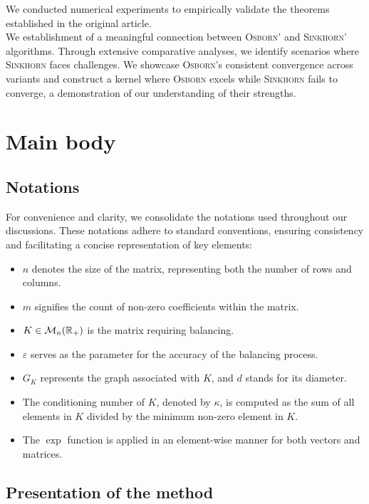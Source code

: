 We conducted numerical experiments to empirically validate the theorems established in the original article.\\

We establishment of a meaningful connection between \textsc{Osborn}' and \textsc{Sinkhorn}' algorithms. Through extensive comparative analyses, we identify scenarios where \textsc{Sinkhorn} faces challenges. We showcase \textsc{Osborn}'s consistent convergence across variants and construct a kernel where \textsc{Osborn} excels while \textsc{Sinkhorn} fails to converge, a demonstration of our understanding of their strengths.

\section{Main body}

\subsection{Notations}

For convenience and clarity, we consolidate the notations used throughout our discussions. These notations adhere to standard conventions, ensuring consistency and facilitating a concise representation of key elements:

\begin{itemize}
    \item \(n\) denotes the size of the matrix, representing both the number of rows and columns.
    \item \(m\) signifies the count of non-zero coefficients within the matrix.
    \item \(K \in \mathcal M_n(\mathbb{R}_+)\) is the matrix requiring balancing.
    \item \(\varepsilon\) serves as the parameter for the accuracy of the balancing process.
    \item \(G_K\) represents the graph associated with \(K\), and \(d\) stands for its diameter.
    \item The conditioning number of \(K\), denoted by \(\kappa\), is computed as the sum of all elements in \(K\) divided by the minimum non-zero element in \(K\).
    \item The \(\exp\) function is applied in an element-wise manner for both vectors and matrices.
\end{itemize}


\subsection{Presentation of the method}

